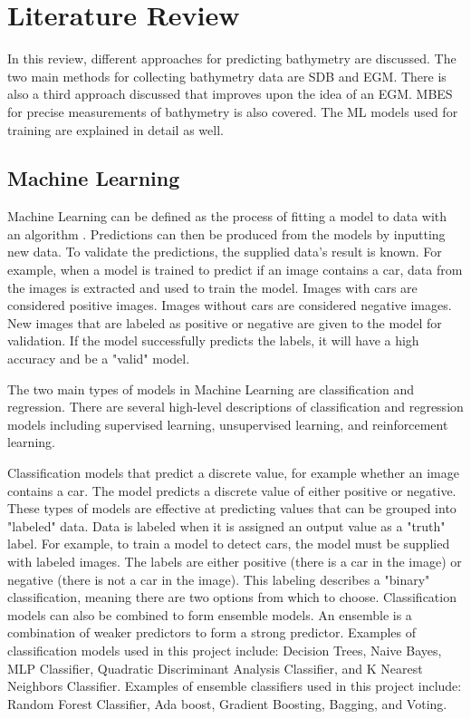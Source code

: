 \section{Literature Review}
\setlength{\parindent}{10ex}
In this review, different approaches for predicting bathymetry are discussed.
The two main methods for collecting bathymetry data are \ac{SDB} and \ac{EGM}.
There is also a third approach discussed that improves upon the idea of an \ac{EGM}.
\ac{MBES} for precise measurements of bathymetry \cite{farr1980multibeam} is also covered.
The \ac{ML} models used for training are explained in detail as well.

\subsection{Machine Learning}
Machine Learning can be defined as the process of fitting a model to data with an algorithm \cite{bishop2006pattern}.
Predictions can then be produced from the models by inputting new data.
To validate the predictions, the supplied data's result is known.
For example, when a model is trained to predict if an image contains a car, data from the images is extracted and used to train the model.
Images with cars are considered positive images.
Images without cars are considered negative images.
New images that are labeled as positive or negative are given to the model for validation.
If the model successfully predicts the labels, it will have a high accuracy and be a "valid" model.

\par
The two main types of models in Machine Learning are classification and regression.
There are several high-level descriptions of classification and regression models including supervised learning, unsupervised learning, and reinforcement learning.

\par
Classification models that predict a discrete value, for example whether an image contains a car.
The model predicts a discrete value of either positive or negative.
These types of models are effective at predicting values that can be grouped into "labeled" data.
Data is labeled when it is assigned an output value as a "truth" label.
For example, to train a model to detect cars, the model must be supplied with labeled images. 
The labels are either positive (there is a car in the image) or negative (there is not a car in the image).
This labeling describes a "binary" classification, meaning there are two options from which to choose.
Classification models can also be combined to form ensemble models.
An ensemble is a combination of weaker predictors to form a strong predictor.
Examples of classification models used in this project include: Decision Trees, Naive Bayes, MLP Classifier, Quadratic Discriminant Analysis Classifier, and K Nearest Neighbors Classifier.
Examples of ensemble classifiers used in this project include: Random Forest Classifier, Ada boost, Gradient Boosting, Bagging, and Voting.

